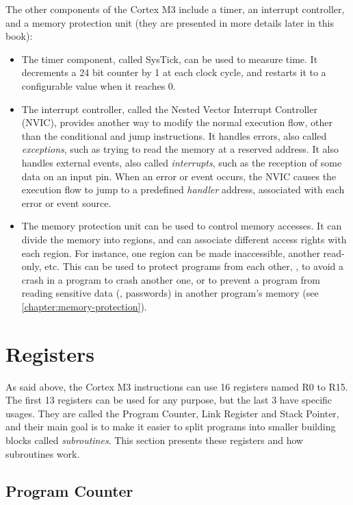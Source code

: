 The other components of the Cortex M3 include a timer, an interrupt controller,
and a memory protection unit (they are presented in more details later in this
book):
\begin{itemize}
  \item The timer component, called SysTick, can be used to measure time. It
  decrements a 24 bit counter by 1 at each clock cycle, and restarts it to a
  configurable value when it reaches 0.

  \item The interrupt controller, called the Nested Vector Interrupt Controller
  (NVIC), provides another way to modify the normal execution flow, other than
  the conditional and jump instructions. It handles errors, also called {\em
  exceptions}, such as trying to read the memory at a reserved address. It also
  handles external events, also called {\em interrupts}, such as the reception
  of some data on an input pin. When an error or event occurs, the NVIC causes
  the execution flow to jump to a predefined {\em handler} address, associated
  with each error or event source.

  \item The memory protection unit can be used to control memory accesses. It
  can divide the memory into regions, and can associate different access rights
  with each region. For instance, one region can be made inaccessible, another
  read-only, etc. This can be used to protect programs from each other, \ie, to
  avoid a crash in a program to crash another one, or to prevent a program from
  reading sensitive data (\eg, passwords) in another program's memory (see
  \cref{chapter:memory-protection}).
\end{itemize}

\section{Registers}\label{section:registers}

As said above, the Cortex M3 instructions can use 16 registers named R0 to R15.
The first 13 registers can be used for any purpose, but the last 3 have
specific usages. They are called the Program Counter, Link Register and Stack
Pointer, and their main goal is to make it easier to split programs into
smaller building blocks called {\em subroutines}. This section presents these
registers and how subroutines work.

\subsection{Program Counter}\label{subsection:program-counter}

